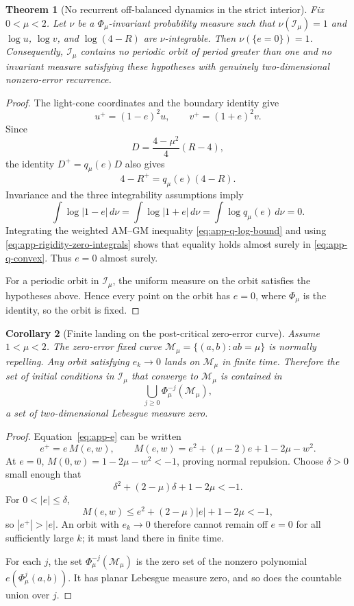 \documentclass[11pt]{article}
\newtheorem{theorem}{Theorem}
\newtheorem{corollary}[theorem]{Corollary}
\newcommand{\M}{\mathcal M}
\begin{document}
\begin{theorem}[No recurrent off-balanced dynamics in the strict interior]
\label{thm:det-interior-rigidity}
Fix \(0<\mu<2\).  Let \(\nu\) be a
\(\Phi_\mu\)-invariant probability measure such that
\(\nu(\mathcal I_\mu)=1\) and
\(\log u\), \(\log v\), and \(\log(4-R)\) are
\(\nu\)-integrable.  Then \(\nu(\{e=0\})=1\).  Consequently,
\(\mathcal I_\mu\) contains no periodic orbit of period greater than one
and no invariant measure satisfying these hypotheses with genuinely
two-dimensional nonzero-error recurrence.
\end{theorem}

\begin{proof}
The light-cone coordinates and the boundary identity give
\[
    u^+=(1-e)^2u,\qquad
    v^+=(1+e)^2v.
\]
Since
\[
    D=\frac{4-\mu^2}{4}(R-4),
\]
the identity \(D^+=q_\mu(e)D\) also gives
\[
    4-R^+=q_\mu(e)(4-R).
\]
Invariance and the three integrability assumptions imply
\begin{equation}
\label{eq:app-rigidity-zero-integrals}
    \int\log|1-e|\,d\nu
    =
    \int\log|1+e|\,d\nu
    =
    \int\log q_\mu(e)\,d\nu
    =0.
\end{equation}
Integrating the weighted AM--GM inequality
\eqref{eq:app-q-log-bound} and using
\eqref{eq:app-rigidity-zero-integrals} shows that equality holds almost
surely in \eqref{eq:app-q-convex}.  Thus \(e=0\) almost surely.

For a periodic orbit in \(\mathcal I_\mu\), the uniform measure on the
orbit satisfies the hypotheses above.  Hence every point on the orbit has
\(e=0\), where \(\Phi_\mu\) is the identity, so the orbit is fixed.
\end{proof}

\begin{corollary}[Finite landing on the post-critical zero-error curve]
\label{cor:det-interior-large-step}
Assume \(1<\mu<2\).  The zero-error fixed curve
\(\M_\mu=\{(a,b):ab=\mu\}\) is normally repelling.  Any orbit satisfying
\(e_k\to0\) lands on \(\M_\mu\) in finite time.  Therefore the set of
initial conditions in \(\mathcal I_\mu\) that converge to \(\M_\mu\) is
contained in
\[
    \bigcup_{j\ge0}\Phi_\mu^{-j}(\M_\mu),
\]
a set of two-dimensional Lebesgue measure zero.
\end{corollary}

\begin{proof}
Equation~\eqref{eq:app-e} can be written
\[
    e^+=e\,M(e,w),
    \qquad
    M(e,w)=e^2+(\mu-2)e+1-2\mu-w^2.
\]
At \(e=0\), \(M(0,w)=1-2\mu-w^2<-1\), proving normal repulsion.  Choose
\(\delta>0\) small enough that
\[
    \delta^2+(2-\mu)\delta+1-2\mu<-1.
\]
For \(0<|e|\le\delta\),
\[
    M(e,w)
    \le e^2+(2-\mu)|e|+1-2\mu<-1,
\]
so \(|e^+|>|e|\).  An orbit with \(e_k\to0\) therefore cannot remain
off \(e=0\) for all sufficiently large \(k\); it must land there in finite
time.

For each \(j\), the set \(\Phi_\mu^{-j}(\M_\mu)\) is the zero set of the
nonzero polynomial \(e(\Phi_\mu^j(a,b))\).  It has planar Lebesgue measure
zero, and so does the countable union over \(j\).
\end{proof}
\end{document}

